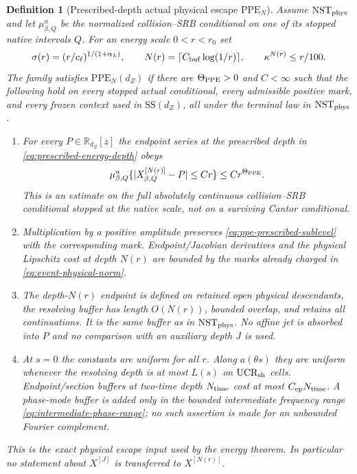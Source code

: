 \documentclass[11pt]{article}
\newtheorem{definition}[theorem]{Definition}
\begin{document}
\begin{definition}[Prescribed-depth actual physical escape
$\mathrm{PPE}_{N}$]
\label{def:physical-legal-extension}
Assume $\mathrm{NST}_{\rm phys}$ and let $\mu^u_{\beta,Q}$ be the
normalized collision--SRB conditional on one of its stopped native intervals
$Q$.  For an energy scale $0<r<r_0$ set
\begin{equation}
\label{eq:prescribed-energy-depth}
 \sigma(r)=(r/c_\ell)^{1/(1+\alpha_L)},\qquad
 N(r)=\lceil C_{\rm buf}\log(1/r)\rceil ,
 \qquad \kappa^{N(r)}\le r/100 .
\end{equation}
The family satisfies $\mathrm{PPE}_{N}(d_Z)$ if there are
$\Theta_{\rm PPE}>0$ and $C<\infty$ such that the following hold on every
stopped actual conditional, every admissible positive mark, and every frozen
context used in $\mathrm{SS}(d_Z)$, all under the terminal law in
$\mathrm{NST}_{\rm phys}$.
\begin{enumerate}[label=\textup{(PPE\arabic*)}]
\item For every $P\in\mathbb R_{d_Z}[z]$ the endpoint series at the
      \emph{prescribed depth in \eqref{eq:prescribed-energy-depth}} obeys
      \begin{equation}
      \label{eq:ppe-prescribed-sublevel}
       \mu^u_{\beta,Q}
       \{|X^{[N(r)]}_{\beta,Q}-P|\le C r\}
       \le C r^{\Theta_{\rm PPE}} .
      \end{equation}
      This is an estimate on the full absolutely continuous collision--SRB
      conditional stopped at the native scale, not on a surviving Cantor
      conditional.
\item Multiplication by a positive amplitude preserves
      \eqref{eq:ppe-prescribed-sublevel} with the corresponding mark.
      Endpoint/Jacobian derivatives and the physical Lipschitz cost at depth
      $N(r)$ are bounded by the marks already charged in
      \eqref{eq:event-physical-norm}.
\item The depth-$N(r)$ endpoint is defined on retained open physical
      descendants, the resolving buffer has length $O(N(r))$, bounded
      overlap, and retains all continuations.  It is the same buffer as in
      $\mathrm{NST}_{\rm phys}$.  No affine jet is absorbed into $P$ and no
      comparison with an auxiliary depth $J$ is used.
\item At $s=0$ the constants are uniform for all $r$.  Along
      $a(\theta s)$ they are uniform whenever the resolving depth is at most
      $L(s)$ on $\mathrm{UCR}_{\rm sh}$ cells.  Endpoint/section buffers at
      two-time depth $N_{\rm time}$ cost at most
      $C_{\rm ep}N_{\rm time}$.  A phase-mode buffer is added only in the
      bounded intermediate frequency range
      \eqref{eq:intermediate-phase-range}; no such assertion is made for an
      unbounded Fourier complement.
\end{enumerate}
This is the exact physical escape input used by the energy theorem.  In
particular no statement about $X^{[J]}$ is transferred to $X^{[N(r)]}$.
\end{definition}
\end{document}
